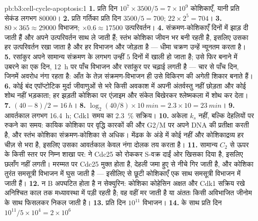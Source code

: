 \begin{solution}{pb:b3:cell-cycle-apoptosis:1}
\textbf{1.} प्रति दिन $10^{7}\times 3500/5 = 7\times 10^{9}$ कोशिकाएँ,
यानी प्रति सेकंड लगभग \num{80000}।
\textbf{2.} प्रति गर्तिका प्रति दिन $3500/5 = 700$; $22\times 2^{5} = 704$।
\textbf{3.} $80\times 365 \approx \num{29000}$ विभाजन; $\times 0.6
\approx \num{17500}$ उत्परिवर्तन।
\textbf{4.} संक्रमण-कोशिकाएँ दिनों में झाड़ दी जाती हैं और अपने
उत्परिवर्तन साथ ले जाती हैं; स्तंभ कोशिका जीवन भर बनी रहती है, इसलिए
उसका हर उत्परिवर्तन रखा जाता है और हर विभाजन और जोड़ता है --- धीमा
चक्रण उन्हें न्यूनतम करता है।
\textbf{5.} रसांकुर अपने सामान्य संक्रमण के लगभग उन्हीं $5$ दिनों में
खाली हो जाता है; उसे फिर बनाने में उबरने का एक दिन, \qty{12}{h} पर
पाँच विभाजन और रसांकुर पर चढ़ाई लगती है --- चार से पाँच दिन, जिनमें
अवरोध नंगा रहता है: आँत के तेज़ संक्रमण-विभाजन ही उसे विकिरण की अगेती
शिकार बनाते हैं।
\textbf{6.} कोई बंद एपॉप्टोटिक मुर्दा जीवाणुओं से भरे किसी अवकाश में
अपनी अंतर्वस्तु नहीं छोड़ता और कोई शोथ नहीं भड़काता;  हर झड़ती
कोशिका पर एंज़ाइम और संकेत बिखेरकर श्लेष्मकला में शोथ कर देता।
\textbf{7.} $(40 - 8)/2 = \qty{16}{h}$।
\textbf{8.} $\log_{2}(40/8)\times \qty{10}{min} = 2.3\times 10 =
\qty{23}{min}$।
\textbf{9.} आवर्तकाल लगभग \qty{16.4}{h}; Cdk1 समय का \qty{2.3}{\%}
सक्रिय।
\textbf{10.} अकेला $k_{s}$ नहीं, बल्कि देहलियों पर रुकने का समय: कायिक
कोशिका  पर वृद्धि कारकों की और G2/M पर अपने DNA की
प्रतीक्षा करती है, और स्तंभ कोशिका संक्रमण-कोशिका से अधिक। मेंढक के
अंडे में कोई  नहीं और कोशिकाद्रव्य हर चीज़ से भरा है, इसलिए
उसका आवर्तकाल केवल नंगा दोलक तय करता है।
\textbf{11.} सामान्य $C_{2}$ से ऊपर के किसी  स्तर पर निम्न शाखा
पर:  ने Cdc25 को रोककर S-वक्र दाईं ओर खिसका दिया है, इसलिए
छलाँग नहीं लगती। मरम्मत पर Cdc25 मुक्त होता है, देहली जमा हुए  से
नीचे गिर जाती है, और कोशिका तुरंत समसूत्री विभाजन में घुस जाती है ---
इसीलिए  से छूटी कोशिकाएँ एक साथ समसूत्री विभाजन में जाती हैं।
\textbf{12.} न  B अपघटित होता है न सेक्युरिन: कोशिका कोहेसिन अक्षत
और Cdk1 सक्रिय रखे अनिश्चित काल तक मध्यावस्था में पड़ी रहती है; वह वहीं
मर जाती है या अंततः किसी अविभाजित जीनोम के साथ फिसलकर निकल जाती है।
\textbf{13.} प्रति दिन $10^{11}$ विभाजन।
\textbf{14.}  के साथ प्रति दिन $10^{11}/5\times 10^{4} = 2\times 10^{6}$

\end{solution}
